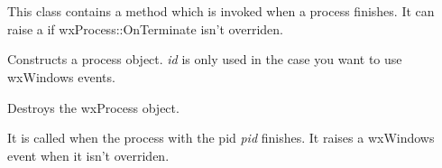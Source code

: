 \section{}\label{wxprocess}

This class contains a method which is invoked when a process finishes.
It can raise a  if wxProcess::OnTerminate
isn't overriden.




\label{wxprocessconstr}


Constructs a process object. {\it id} is only used in the case you want to
use wxWindows events. 






Destroys the wxProcess object.

\label{wxprocessonterminate}


It is called when the process with the pid {\it pid} finishes.
It raises a wxWindows event when it isn't overriden.

